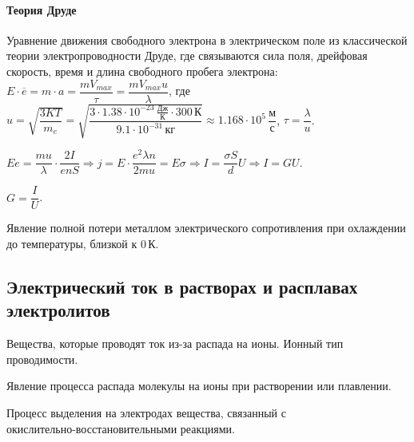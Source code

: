 \documentclass[12pt]{article}
\begin{document}
	\paragraph{Теория Друде} Уравнение движения свободного электрона в электрическом поле из классической теории электропроводности Друде, где связываются сила поля, дрейфовая скорость, время и длина свободного пробега электрона: $E \cdot \overline{e} = m \cdot a = \dfrac{m V_{max}}{\tau} = \dfrac{m V_{max} u}{\lambda}$, где $u = \sqrt{\dfrac{3KT}{m_e}} = \sqrt{\dfrac{3 \cdot 1.38 \cdot 10^{-23} \, \frac{\text{Дж}}{\text{К}} \cdot 300 \, \text{К}}{9.1 \cdot 10^{-31} \, \text{кг}}} \approx 1.168 \cdot 10^5 \, \dfrac{\text{м}}{\text{с}}$, $\tau = \dfrac{\lambda}{u}$.
	
	$E e = \dfrac{m u}{\lambda} \cdot \dfrac{2 I}{e n S} \Rightarrow j = E \cdot \dfrac{e^2 \lambda n}{2 m u} = E \sigma \Rightarrow I = \dfrac{\sigma S}{d} U \Rightarrow I = GU$.
	
	\begin{definition}
		$G = \dfrac{I}{U}$.
	\end{definition}
	
	\begin{definition}[Сверхпроводимость]
		Явление полной потери металлом электрического сопротивления при охлаждении до температуры, близкой к $0 \, \text{К}$.
	\end{definition}
	
	\subsection{Электрический ток в растворах и расплавах электролитов}
	
	\begin{definition}[Электролиты]
		Вещества, которые проводят ток из-за распада на ионы. Ионный тип проводимости.
	\end{definition}
	
	\begin{definition}
		Явление процесса распада молекулы на ионы при растворении или плавлении.
	\end{definition}
	
	\begin{definition}[Электролиз]
		Процесс выделения на электродах вещества, связанный с\\ окислительно-восстановительными реакциями.
	\end{definition}
	
\end{document}
